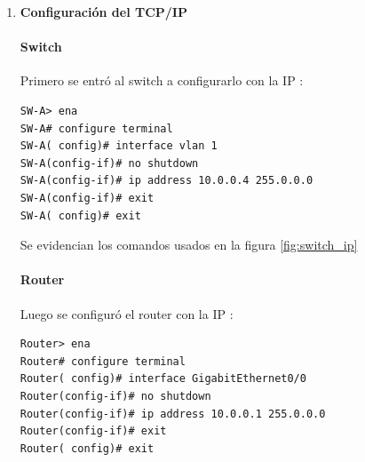 \begin{enumerate}[series=labsteps]
\paragraph{¿Por qué se realiza toda esta configuración básica a los dispositivos 
    switch y router?}

Dado que los dispositivos que vienen con configuración de fábrica no tienen ninguna contraseña, son vulnerables a
ataques bastante simples. Las configuraciones, específicamente las contraseñas, permiten agregar una capa de seguridad
contra actores maliciosos. También se configuró el nombre del dispositivo en terminal para que sea más fácil
diferenciarlo; esto es especialmente útil si no se está físicamente cerca del dispositivo. Además, se activó el acceso a
terminal de manera remota, con su respectiva contraseña.


\subsubsection*{Evidencias}
\begin{itemize}
\item Capturas de la configuración en la CLI del router.
\end{itemize}


\item \textbf{Configuración del TCP/IP}

\paragraph{Switch} Primero se entró al switch a configurarlo con la IP :
\begin{verbatim}
SW-A> ena
SW-A# configure terminal
SW-A( config)# interface vlan 1
SW-A(config-if)# no shutdown
SW-A(config-if)# ip address 10.0.0.4 255.0.0.0
SW-A(config-if)# exit
SW-A( config)# exit
\end{verbatim}
Se evidencian los comandos usados en la figura \ref{fig:switch_ip}

\paragraph{Router} Luego se configuró el router con la IP :
\begin{verbatim}
Router> ena
Router# configure terminal
Router( config)# interface GigabitEthernet0/0
Router(config-if)# no shutdown
Router(config-if)# ip address 10.0.0.1 255.0.0.0
Router(config-if)# exit
Router( config)# exit
\end{verbatim}


\end{enumerate}
